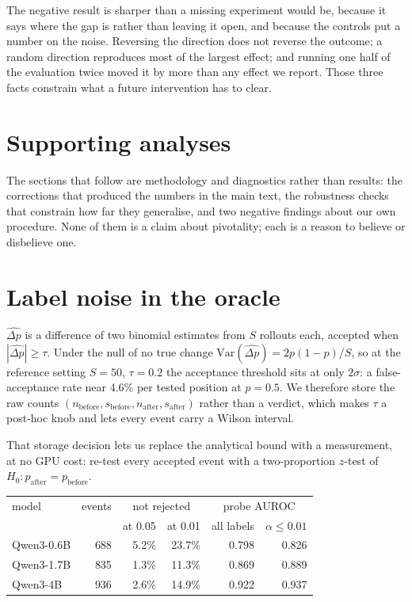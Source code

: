 \documentclass{article}
\newcommand{\pdelta}{\Delta p}
\begin{document}
The negative result is sharper than a missing experiment would be, because
it says where the gap is rather than leaving it open, and because the
controls put a number on the noise. Reversing the direction does not
reverse the outcome; a random direction reproduces most of the largest
effect; and running one half of the evaluation twice moved it by more than
any effect we report. Those three facts constrain what a future
intervention has to clear.




\appendix

\section{Supporting analyses}

The sections that follow are methodology and diagnostics rather than
results: the corrections that produced the numbers in the main text, the
robustness checks that constrain how far they generalise, and two negative
findings about our own procedure. None of them is a claim about pivotality;
each is a reason to believe or disbelieve one.

\section{Label noise in the oracle}
\label{sec:labelnoise}

$\widehat{\pdelta}$ is a difference of two binomial estimates from $S$
rollouts each, accepted when $|\widehat{\pdelta}| \ge \tau$. Under the null
of no true change $\mathrm{Var}(\widehat{\pdelta}) = 2p(1-p)/S$, so at the
reference setting $S{=}50$, $\tau{=}0.2$ the acceptance threshold sits at
only $2\sigma$: a false-acceptance rate near 4.6\% per tested position at
$p{=}0.5$. We therefore store the raw counts
$(n_{\text{before}}, s_{\text{before}}, n_{\text{after}}, s_{\text{after}})$
rather than a verdict, which makes $\tau$ a post-hoc knob and lets every
event carry a Wilson interval.

That storage decision lets us replace the analytical bound with a
measurement, at no GPU cost: re-test every accepted event with a
two-proportion $z$-test of $H_0: p_{\text{after}} = p_{\text{before}}$.

\begin{center}
\begin{tabular}{lrrrrr}
\toprule
model & events & \multicolumn{2}{c}{not rejected} & \multicolumn{2}{c}{probe AUROC} \\
 & & at 0.05 & at 0.01 & all labels & $\alpha \le 0.01$ \\
\midrule
Qwen3-0.6B & 688 & 5.2\% & 23.7\% & 0.798 & 0.826 \\
Qwen3-1.7B & 835 & 1.3\% & 11.3\% & 0.869 & 0.889 \\
Qwen3-4B   & 936 & 2.6\% & 14.9\% & 0.922 & 0.937 \\
\bottomrule
\end{tabular}
\end{center}
\end{document}
